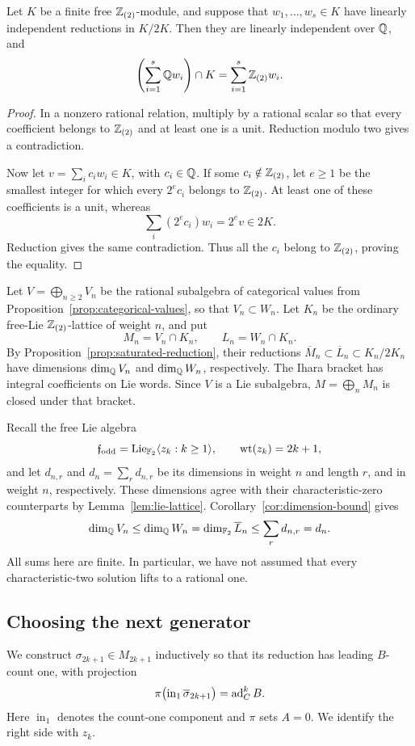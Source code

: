 \begin{lemma}\label{lem:hall-saturation}
Let \(K\) be a finite free \(\mathbb Z_{(2)}\)-module, and suppose that
\(w_1,\ldots,w_s\in K\) have linearly independent reductions in
\(K/2K\).  Then they are linearly independent over \(\mathbb Q\), and
\[
 \left(\sum_{i=1}^s\mathbb Q w_i\right)\cap K
   =\sum_{i=1}^s\mathbb Z_{(2)}w_i.
\]
\end{lemma}
\begin{proof}
In a nonzero rational relation, multiply by a rational scalar so
that every coefficient belongs to \(\mathbb Z_{(2)}\) and at least one is
a unit.  Reduction modulo two gives a contradiction.

Now let \(v=\sum_i c_iw_i\in K\), with \(c_i\in\mathbb Q\).
If some \(c_i\notin\mathbb Z_{(2)}\), let \(e\ge1\) be the smallest integer
for which every \(2^ec_i\) belongs to \(\mathbb Z_{(2)}\).
At least one of these coefficients is a unit, whereas
\[
 \sum_i(2^ec_i)w_i=2^ev\in2K.
\]
Reduction gives the same contradiction.  Thus all the \(c_i\)
belong to \(\mathbb Z_{(2)}\), proving the equality.
\end{proof}

Let \(V=\bigoplus_{n\ge2}V_n\) be the rational subalgebra of
categorical values from Proposition~\ref{prop:categorical-values},
so that \(V_n\subset W_n\).
Let \(K_n\) be the ordinary free-Lie \(\mathbb Z_{(2)}\)-lattice of
weight \(n\), and put
\[
 M_n=V_n\cap K_n,\qquad L_n=W_n\cap K_n.
\]
By Proposition~\ref{prop:saturated-reduction}, their reductions
\(\overline M_n\subset\overline L_n\subset K_n/2K_n\) have
dimensions \(\dim_\mathbb Q V_n\) and \(\dim_\mathbb Q W_n\), respectively.
The Ihara bracket has integral coefficients on Lie words.
Since \(V\) is a Lie subalgebra, \(M=\bigoplus_n M_n\) is closed
under that bracket.

Recall the free Lie algebra
\[
 \mathfrak f_{\mathrm{odd}}
   =\operatorname{Lie}_{{\mathbb F_2}}\langle z_k:k\ge1\rangle,\qquad
 \operatorname{wt}(z_k)=2k+1,
\]
and let \(d_{n,r}\) and \(d_n=\sum_r d_{n,r}\) be its dimensions
in weight \(n\) and length \(r\), and in weight \(n\), respectively.
These dimensions agree with their characteristic-zero counterparts
by Lemma~\ref{lem:lie-lattice}.
Corollary~\ref{cor:dimension-bound} gives
\begin{equation}\label{eq:dimension-squeeze}
 \dim_\mathbb Q V_n
 \le \dim_\mathbb Q W_n
 =\dim_{\mathbb F_2}\overline L_n
 \le\sum_r d_{n,r}=d_n.
\end{equation}
All sums here are finite.  In particular, we have not assumed
that every characteristic-two solution lifts to a rational one.

\subsection{Choosing the next generator}
We construct \(\sigma_{2k+1}\in M_{2k+1}\) inductively so that
its reduction has leading \(B\)-count one, with projection
\begin{equation}\label{eq:generator-leading-term}
 \pi\bigl(\operatorname{in}_1\overline\sigma_{2k+1}\bigr)
       =\operatorname{ad}_C^kB.
\end{equation}
Here \(\operatorname{in}_1\) denotes the count-one component and
\(\pi\) sets \(A=0\).  We identify the right side with \(z_k\).

